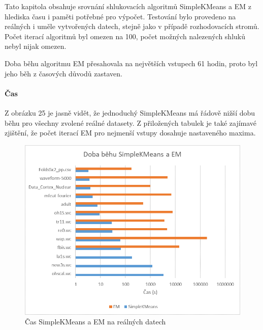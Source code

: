 \documentclass[12pt]{article}
\begin{document}
\newpage
{}
Tato kapitola obsahuje srovnání shlukovacích algoritmů SimpleKMeans a EM z hlediska času i paměti potřebné pro výpočet. Testování bylo provedeno na reálných i uměle vytvořených datech, stejně jako v případě rozhodovacích stromů. Počet iterací algoritmů byl omezen na 100, počet možných nalezených shluků nebyl nijak omezen.

\newpage
{}
Doba běhu algoritmu EM přesahovala na největších vstupech 61 hodin, proto byl jeho běh z časových důvodů zastaven. 
\paragraph{Čas}
Z obrázku 25 je jasně vidět, že jednoduchý SimpleKMeans má řádově nižší dobu běhu pro všechny zvolené reálné datasety. Z přiložených tabulek je také zajímavé zjištění, že počet iterací EM pro nejmenší vstupy dosahuje nastaveného maxima.
\begin{figure}[hbp]
  \centering
  \includegraphics[scale=1]{img/realclusttime.png}
  \caption{Čas SimpleKMeans a EM na reálných datech}
\end{figure}

\newpage
\end{document}

